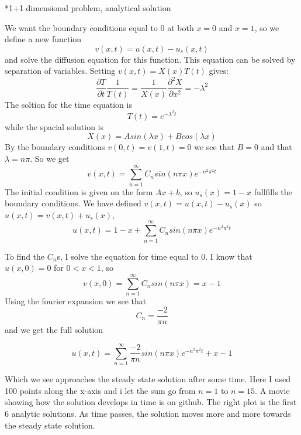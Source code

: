 \documentclass[a4paper, 12pt, titlepage]{article}
\newcommand{\f}[2]{\frac{#1}{#2}}
\newcommand{\beq}{\begin{equation*}}
\newcommand{\eeq}{\end{equation*}}
\newcommand{\pa}{\partial}
\begin{document}
 \begin{section}*{1+1 dimensional problem, analytical solution}
 
    We want the boundary conditions equal to $0$ at both $x=0$ and $x=1$, so we define a new function 
    \beq v(x,t) = u(x,t) - u_s(x,t) \eeq
    and solve the diffusion equation for this function. This equation can be solved by separation of
    variables. Setting $v(x,t) = X(x)T(t)$ gives:
    \beq \f{\pa T}{\pa t} \f{1}{T(t)} = \f{1}{X(x)} \f{\pa ^2 X}{\pa x^2} = -\lambda ^2\eeq
    The soltion for the time equation is \beq T(t) = e^{-\lambda ^2 t} \eeq while the spacial solution is
    \beq X(x) = Asin(\lambda x) + Bcos(\lambda x) \eeq
    By the boundary conditions $v(0,t) = v(1,t) = 0$ we see that $B = 0$ and that $\lambda = n\pi$. 
    So we get \beq v(x,t) = \sum_{n=1}^{\infty} C_n sin(n\pi x) e^{-n^2\pi ^2 t} \eeq
    The initial condition is given on the form $Ax + b$, so $u_s(x) = 1-x$ fullfills the boundary conditions. 
    We have defined $v(x,t) = u(x,t) - u_s(x)$ so $u(x,t) = v(x,t) + u_s(x)$, 
    \beq u(x,t) = 1 - x + \sum_{n=1}^{\infty} C_n sin(n\pi x)e^{-n^2\pi ^2 t}  \eeq 
    
    To find the $C_n$s, I solve the equation for time equal to 0. I know that $u(x,0) = 0$ for $0<x<1$, so
    \beq v(x,0) = \sum_{n=1}^{\infty} C_n sin(n\pi x) = x - 1 \eeq
    Using the fourier expansion we see that \beq C_n = \f{-2}{\pi n} \eeq and we get the full solution
    
    \beq u(x,t) = \sum_{n=1}^{\infty} \f{-2}{\pi n} sin(n\pi x) e^{-n^2\pi ^2 t} + x - 1 \eeq
    
    Which we see approaches the steady state solution after some time. Here I used 100 points along the 
    x-axis and i let the sum go from $n=1$ to $n=15$. A movie showing how the solution develops in time is
    on github. The right plot is the first 6 analytic solutions. As time passes, the solution moves more 
    and more towards the steady state solution.
    

\end{section}
\end{document}
